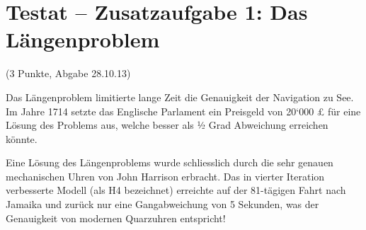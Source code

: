 


\section{Testat – Zusatzaufgabe 1: Das Längenproblem}
(3 Punkte, Abgabe 28.10.13)

Das Längenproblem limitierte lange Zeit die Genauigkeit der Navigation zu See. 
Im Jahre 1714 setzte das Englische Parlament ein Preisgeld von 20‘000 £ für 
eine Lösung des Problems  aus, welche besser als ½ Grad Abweichung erreichen 
könnte.

Eine Lösung des Längenproblems wurde schliesslich durch die sehr genauen 
mechanischen Uhren von John Harrison erbracht. Das in vierter Iteration 
verbesserte Modell (als H4 bezeichnet) erreichte auf der 81-tägigen Fahrt nach 
Jamaika und zurück nur eine Gangabweichung von 5 Sekunden, was der Genauigkeit 
von modernen Quarzuhren entspricht!


